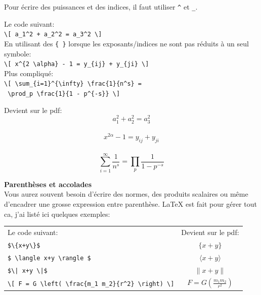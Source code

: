 \documentclass[11pt]{article}				%
\begin{document}
Pour écrire des puissances et des indices, il faut utiliser \verb|^| et \verb|_|.

\begin{multicols}{2}
Le code suivant:\\

\verb|\[ a_1^2 + a_2^2 = a_3^2 \]| \\

En utilisant des \texttt{\{ \}} lorsque les exposants/indices ne sont pas réduits à un seul symbole:\\

\verb|\[ x^{2 \alpha} - 1 = y_{ij} + y_{ji} \]|\\

Plus compliqué:\\

\verb|\[ \sum_{i=1}^{\infty} \frac{1}{n^s} =| \\
\verb| \prod_p \frac{1}{1 - p^{-s}} \] |

\columnbreak
\centering
Devient sur le pdf:\\

$$ a_1^2 + a_2^2 = a_3^2$$\\
$$ x^{2 \alpha} - 1 = y_{ij} + y_{ji} $$\\
\[ \sum_{i=1}^{\infty} \frac{1}{n^s} = \prod_p \frac{1}{1 - p^{-s}} \]

\end{multicols}

\textbf{Parenthèses et accolades}\\

Vous aurez souvent besoin d'écrire des normes, des produits scalaires ou même d'encadrer une grosse expression entre parenthèse. LaTeX est fait pour gérer tout ca, j'ai listé ici quelques exemples:\\

\begin{tabular}{lc}
\vspace{11pt} Le code suivant: & Devient sur le pdf:\\
	
\verb|$\{x+y\}$| & $ \{x+y\} $ \\

\verb|$ \langle x+y \rangle $| & $ \langle x+y \rangle $ \\

\verb?$\| x+y \|$? & $\| x+y \|$ \\

\verb|\[ F = G \left( \frac{m_1 m_2}{r^2} \right) \]| & $ F = G \left( \frac{m_1 m_2}{r^2} \right) $ \\

\end{tabular}\\
\end{document}
